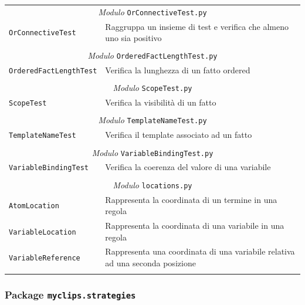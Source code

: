 \begin{longtable}{p{5.5cm}p{6.5cm}}
\multicolumn{2}{c}{\emph{Modulo} \texttt{OrConnectiveTest.py}}\\
	\hdashline[5pt/5pt]
		\texttt{OrConnectiveTest} & Raggruppa un insieme di test e verifica che almeno uno sia positivo\\ 
	\hline\\

\multicolumn{2}{c}{\emph{Modulo} \texttt{OrderedFactLengthTest.py}}\\
	\hdashline[5pt/5pt]
		\texttt{OrderedFactLengthTest} & Verifica la lunghezza di un fatto ordered \\ 
	\hline\\

\multicolumn{2}{c}{\emph{Modulo} \texttt{ScopeTest.py}}\\
	\hdashline[5pt/5pt]
		\texttt{ScopeTest} & Verifica la visibilità di un fatto\\ 
	\hline\\

\multicolumn{2}{c}{\emph{Modulo} \texttt{TemplateNameTest.py}}\\
	\hdashline[5pt/5pt]
		\texttt{TemplateNameTest} & Verifica il template associato ad un fatto\\ 
	\hline\\

\multicolumn{2}{c}{\emph{Modulo} \texttt{VariableBindingTest.py}}\\
	\hdashline[5pt/5pt]
		\texttt{VariableBindingTest} & Verifica la coerenza del valore di una variabile\\ 
	\hline\\

\multicolumn{2}{c}{\emph{Modulo} \texttt{locations.py}}\\
	\hdashline[5pt/5pt]
		\texttt{AtomLocation} & Rappresenta la coordinata di un termine in una regola\\ 
	\hdashline[1pt/5pt]
		\texttt{VariableLocation} & Rappresenta la coordinata di una variabile in una regola\\ 
	\hdashline[1pt/5pt]
		\texttt{VariableReference} & Rappresenta una coordinata di una variabile relativa ad una seconda posizione\\ 
	\hline\\


\end{longtable}

\subsubsection{Package \texttt{myclips.strategies}}

